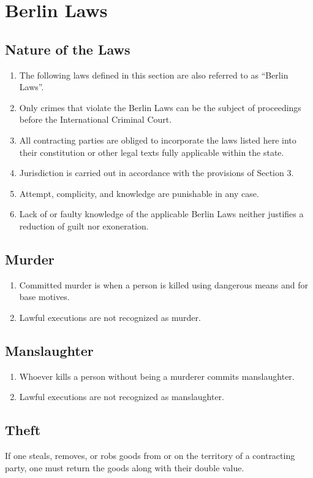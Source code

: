 \documentclass{article}
\begin{document}
\section{Berlin Laws}
\subsection{Nature of the Laws}
\begin{enumerate}[(1)]
    \item The following laws defined in this section are also referred to as ``Berlin Laws''.
    \item Only crimes that violate the Berlin Laws can be the subject of proceedings before the International Criminal Court.
    \item All contracting parties are obliged to incorporate the laws listed here into their constitution or other legal texts fully applicable within the state.
    \item Jurisdiction is carried out in accordance with the provisions of Section 3.
    \item Attempt, complicity, and knowledge are punishable in any case.
    \item Lack of or faulty knowledge of the applicable Berlin Laws neither justifies a reduction of guilt nor exoneration.
\end{enumerate}

\subsection{Murder}
\begin{enumerate}[(1)]
    \item Committed murder is when a person is killed using dangerous means and for base motives.
    \item Lawful executions are not recognized as murder.
\end{enumerate}

\subsection{Manslaughter}
\begin{enumerate}[(1)]
    \item Whoever kills a person without being a murderer commits manslaughter.
    \item Lawful executions are not recognized as manslaughter.
\end{enumerate}

\subsection{Theft}
If one steals, removes, or robs goods from or on the territory of a contracting party, one must return the goods along with their double value.
\end{document}
